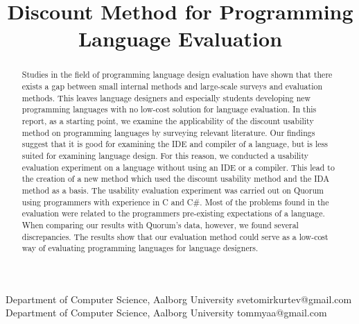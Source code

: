 \documentclass[preprint,10pt]{sigplanconf}
\begin{document}
\setlength{\pdfpageheight}{\paperheight}
\setlength{\pdfpagewidth}{\paperwidth}




\title{Discount Method for Programming Language Evaluation}

           {Department of Computer Science, Aalborg University}
           {svetomirkurtev@gmail.com}
           {Department of Computer Science, Aalborg University}
           {tommyaa@gmail.com}

\maketitle

\begin{abstract}
Studies in the field of programming language design evaluation have shown that there exists a gap between small internal methods and large-scale surveys and evaluation methods. This leaves language designers and especially students developing new programming languages with no low-cost solution for language evaluation. In this report, as a starting point, we examine the applicability of the discount usability method on programming languages by surveying relevant literature. Our findings suggest that it is good for examining the IDE and compiler of a language, but is less suited for examining language design. For this reason, we conducted a usability evaluation experiment on a language without using an IDE or a compiler. This lead to the creation of a new method which used the discount usability method and the IDA method as a basis. The usability evaluation experiment was carried out on Quorum using programmers with experience in C and C\#. Most of the problems found in the evaluation were related to the programmers pre-existing expectations of a language. When comparing our results with Quorum’s data, however, we found several discrepancies.  The results show that our evaluation method could serve as a low-cost way of evaluating programming languages for language designers. 
\end{abstract}
\end{document}
